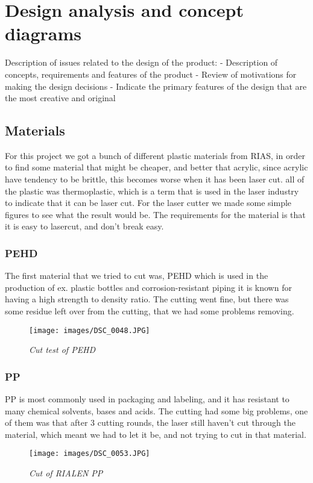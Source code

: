 \section{Design analysis and concept diagrams}
Description of issues related to the design of the product:
- Description of concepts, requirements and features of the product
- Review of motivations for making the design decisions
- Indicate the primary features of the design that are the most creative and original

\subsection{Materials}
For this project we got a bunch of different plastic materials from RIAS, in order to find some material that might be cheaper, and better that acrylic, since acrylic have tendency to be brittle, this becomes worse when it has been laser cut.
all of the plastic was thermoplastic, which is a term that is used in the laser industry to indicate that it can be laser cut.
For the laser cutter we made some simple figures to see what the result would be.
The requirements for the material is that it is easy to lasercut, and don't break easy.
\subsubsection{PEHD}
The first material that we tried to cut was, PEHD which is used in the production of ex. plastic bottles and corrosion-resistant piping it is known for having a high strength to density ratio.
The cutting went fine, but there was some residue left over from the cutting, that we had some problems removing.
\begin{figure}[!h]
	\centering
	\texttt{[image: images/DSC\_0048.JPG]}
	\caption{\small {\it {Cut test of PEHD}}} \label{fig:explode}
\end{figure}
\FloatBarrier
\subsubsection{ PP}
 PP is most commonly used in packaging and labeling, and it has resistant to many chemical solvents, bases and acids.
The cutting had some big problems, one of them was that after 3 cutting rounds, the laser still haven't cut through the material, which meant we had to let it be, and not trying to cut in that material.
\begin{figure}[!h]
	\centering
	\texttt{[image: images/DSC\_0053.JPG]}
	\caption{\small {\it {Cut of RIALEN PP}}} \label{fig:explode}
\end{figure}
\FloatBarrier
